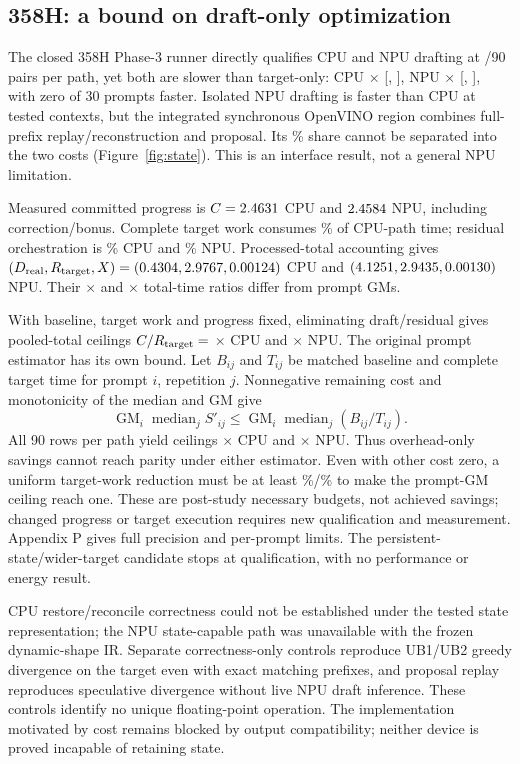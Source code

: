 \subsection{358H: a bound on draft-only optimization}
\label{sec:state}

The closed 358H Phase-3 runner directly qualifies CPU and NPU drafting at \HExact/90 pairs per path, yet both are slower than target-only: CPU \HcpuSpeed$\times$ [\HcpuLo, \HcpuHi], NPU \HnpuSpeed$\times$ [\HnpuLo, \HnpuHi], with zero of 30 prompts faster. Isolated NPU drafting is faster than CPU at tested contexts, but the integrated synchronous OpenVINO region combines full-prefix replay/reconstruction and proposal. Its \HnpuDraft\% share cannot be separated into the two costs (Figure~\ref{fig:state}). This is an interface result, not a general NPU limitation.

Measured committed progress is $C=2.4631$ CPU and $2.4584$ NPU, including correction/bonus. Complete target work consumes \HcpuTarget\% of CPU-path time; residual orchestration is \HcpuResidual\% CPU and \HnpuResidual\% NPU. Processed-total accounting gives $(D_{\mathrm{real}},R_{\mathrm{target}},X)=(0.4304,2.9767,0.00124)$ CPU and $(4.1251,2.9435,0.00130)$ NPU. Their \HcpuAggregate$\times$ and \HnpuAggregate$\times$ total-time ratios differ from prompt GMs.

With baseline, target work and progress fixed, eliminating draft/residual gives pooled-total ceilings $C/R_{\mathrm{target}}=$ \DerCPUZero$\times$ CPU and \DerNPUZero$\times$ NPU. The original prompt estimator has its own bound. Let $B_{ij}$ and $T_{ij}$ be matched baseline and complete target time for prompt $i$, repetition $j$. Nonnegative remaining cost and monotonicity of the median and GM give
\begin{equation}
\operatorname{GM}_i\operatorname{median}_j S'_{ij}
\le \operatorname{GM}_i\operatorname{median}_j(B_{ij}/T_{ij}).
\label{eq:promptceiling}
\end{equation}
All 90 rows per path yield ceilings \DiagCPUCeiling$\times$ CPU and \DiagNPUCeiling$\times$ NPU. Thus overhead-only savings cannot reach parity under either estimator. Even with other cost zero, a uniform target-work reduction must be at least \DiagCPUReduction\%/\DiagNPUReduction\% to make the prompt-GM ceiling reach one. These are post-study necessary budgets, not achieved savings; changed progress or target execution requires new qualification and measurement. Appendix P gives full precision and per-prompt limits. The persistent-state/wider-target candidate stops at qualification, with no performance or energy result.

CPU restore/reconcile correctness could not be established under the tested state representation; the NPU state-capable path was unavailable with the frozen dynamic-shape IR. Separate correctness-only controls reproduce UB1/UB2 greedy divergence on the target even with exact matching prefixes, and proposal replay reproduces speculative divergence without live NPU draft inference. These controls identify no unique floating-point operation. The implementation motivated by cost remains blocked by output compatibility; neither device is proved incapable of retaining state.
